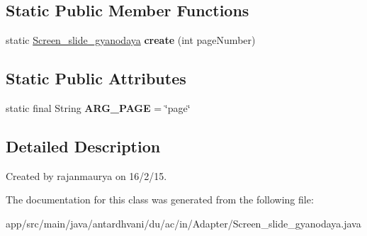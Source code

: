 \subsection*{Static Public Member Functions}
\begin{DoxyCompactItemize}
\item 
\hypertarget{classantardhvani_1_1du_1_1ac_1_1in_1_1_adapter_1_1_screen__slide__gyanodaya_a055ab9c4afbd80a0ed4f2591d8e1b508}{}static \hyperlink{classantardhvani_1_1du_1_1ac_1_1in_1_1_adapter_1_1_screen__slide__gyanodaya}{Screen\+\_\+slide\+\_\+gyanodaya} {\bfseries create} (int page\+Number)\label{classantardhvani_1_1du_1_1ac_1_1in_1_1_adapter_1_1_screen__slide__gyanodaya_a055ab9c4afbd80a0ed4f2591d8e1b508}

\end{DoxyCompactItemize}
\subsection*{Static Public Attributes}
\begin{DoxyCompactItemize}
\item 
\hypertarget{classantardhvani_1_1du_1_1ac_1_1in_1_1_adapter_1_1_screen__slide__gyanodaya_a8e00c29d4001c5f5aef4100ade56b2c8}{}static final String {\bfseries A\+R\+G\+\_\+\+P\+A\+G\+E} = \char`\"{}page\char`\"{}\label{classantardhvani_1_1du_1_1ac_1_1in_1_1_adapter_1_1_screen__slide__gyanodaya_a8e00c29d4001c5f5aef4100ade56b2c8}

\end{DoxyCompactItemize}


\subsection{Detailed Description}
Created by rajanmaurya on 16/2/15. 

The documentation for this class was generated from the following file\+:\begin{DoxyCompactItemize}
\item 
app/src/main/java/antardhvani/du/ac/in/\+Adapter/Screen\+\_\+slide\+\_\+gyanodaya.\+java\end{DoxyCompactItemize}
